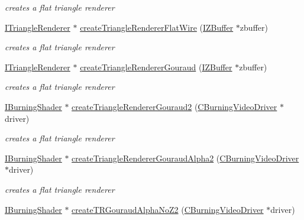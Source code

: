 \begin{DoxyCompactItemize}
\begin{DoxyCompactList}\small\item\em creates a flat triangle renderer \end{DoxyCompactList}\item 
\hyperlink{classirr_1_1video_1_1_i_triangle_renderer}{I\-Triangle\-Renderer} $\ast$ \hyperlink{namespaceirr_1_1video_a6baad86f6dedffc76ce6b250c6b10f86}{create\-Triangle\-Renderer\-Flat\-Wire} (\hyperlink{classirr_1_1video_1_1_i_z_buffer}{I\-Z\-Buffer} $\ast$zbuffer)
\begin{DoxyCompactList}\small\item\em creates a flat triangle renderer \end{DoxyCompactList}\item 
\hyperlink{classirr_1_1video_1_1_i_triangle_renderer}{I\-Triangle\-Renderer} $\ast$ \hyperlink{namespaceirr_1_1video_aa13d280de0f8c7a6b5f836889652ce00}{create\-Triangle\-Renderer\-Gouraud} (\hyperlink{classirr_1_1video_1_1_i_z_buffer}{I\-Z\-Buffer} $\ast$zbuffer)
\begin{DoxyCompactList}\small\item\em creates a flat triangle renderer \end{DoxyCompactList}\item 
\hyperlink{classirr_1_1video_1_1_i_burning_shader}{I\-Burning\-Shader} $\ast$ \hyperlink{namespaceirr_1_1video_a2bfbe41be9e048e84a3e9bec8ef916ae}{create\-Triangle\-Renderer\-Gouraud2} (\hyperlink{classirr_1_1video_1_1_c_burning_video_driver}{C\-Burning\-Video\-Driver} $\ast$driver)
\begin{DoxyCompactList}\small\item\em creates a flat triangle renderer \end{DoxyCompactList}\item 
\hyperlink{classirr_1_1video_1_1_i_burning_shader}{I\-Burning\-Shader} $\ast$ \hyperlink{namespaceirr_1_1video_a11b0e9c9a44bcc1e9c3217114efcfbc0}{create\-Triangle\-Renderer\-Gouraud\-Alpha2} (\hyperlink{classirr_1_1video_1_1_c_burning_video_driver}{C\-Burning\-Video\-Driver} $\ast$driver)
\begin{DoxyCompactList}\small\item\em creates a flat triangle renderer \end{DoxyCompactList}\item 
\hyperlink{classirr_1_1video_1_1_i_burning_shader}{I\-Burning\-Shader} $\ast$ \hyperlink{namespaceirr_1_1video_afabf8aaca4eb1d777237a63d7467cb9f}{create\-T\-R\-Gouraud\-Alpha\-No\-Z2} (\hyperlink{classirr_1_1video_1_1_c_burning_video_driver}{C\-Burning\-Video\-Driver} $\ast$driver)

\end{DoxyCompactItemize}
